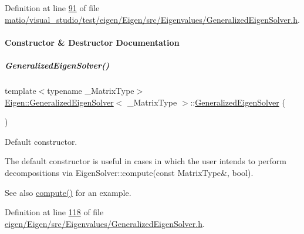 Definition at line \hyperlink{matio_2visual__studio_2test_2eigen_2_eigen_2src_2_eigenvalues_2_generalized_eigen_solver_8h_source_l00091}{91} of file \hyperlink{matio_2visual__studio_2test_2eigen_2_eigen_2src_2_eigenvalues_2_generalized_eigen_solver_8h_source}{matio/visual\+\_\+studio/test/eigen/\+Eigen/src/\+Eigenvalues/\+Generalized\+Eigen\+Solver.\+h}.



\paragraph{Constructor \& Destructor Documentation}
\mbox{\label{group___eigenvalues___module_ae745f39da43f9df192cc2875d82b4cf1}} 
\subparagraph{\texorpdfstring{Generalized\+Eigen\+Solver()}{GeneralizedEigenSolver()}\hspace{0.1cm}{\footnotesize\ttfamily [1/6]}}
{\footnotesize\ttfamily template$<$typename \+\_\+\+Matrix\+Type$>$ \\
\hyperlink{group___eigenvalues___module_class_eigen_1_1_generalized_eigen_solver}{Eigen\+::\+Generalized\+Eigen\+Solver}$<$ \+\_\+\+Matrix\+Type $>$\+::\hyperlink{group___eigenvalues___module_class_eigen_1_1_generalized_eigen_solver}{Generalized\+Eigen\+Solver} (\begin{DoxyParamCaption}{ }\end{DoxyParamCaption})\hspace{0.3cm}{\ttfamily [inline]}}



Default constructor. 

The default constructor is useful in cases in which the user intends to perform decompositions via Eigen\+Solver\+::compute(const Matrix\+Type\&, bool).

\begin{DoxySeeAlso}{See also}
\hyperlink{group___eigenvalues___module_a275910b47dfe5f40211dcb59cfd68f3c}{compute()} for an example. 
\end{DoxySeeAlso}


Definition at line \hyperlink{eigen_2_eigen_2src_2_eigenvalues_2_generalized_eigen_solver_8h_source_l00118}{118} of file \hyperlink{eigen_2_eigen_2src_2_eigenvalues_2_generalized_eigen_solver_8h_source}{eigen/\+Eigen/src/\+Eigenvalues/\+Generalized\+Eigen\+Solver.\+h}.


